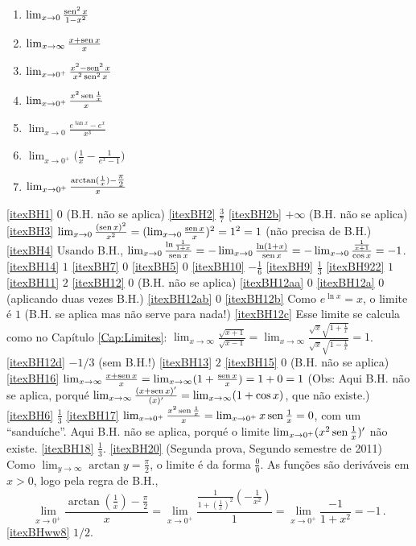 \begin{exo}
\begin{multicols}{3}
\begin{enumerate}
\item\label{itexBH15} $\lim_{x\to 0}\frac{\operatorname{sen}^2x}{1-x^2}$ 
\item\label{itexBH16} $\lim_{x\to \infty}\frac{x+\operatorname{sen} x}{x}$ 
\item\label{itexBH6} $\lim_{x\to 0^+}\frac{x^2-\operatorname{sen}^2 x}{x^2\operatorname{sen}^2 x}$
\item\label{itexBH17} $\lim_{x\to 0^+}\frac{x^2 \operatorname{sen} \frac{1}{x}}{x}$ 
\item\label{itexBH18} $\lim_{x\to 0}\frac{e^{\tan x}-e^x}{x^3}$ %
\item\label{itexBHww8} $\lim_{x\to
0^+}\bigl(\frac{1}{x}-\frac{1}{e^x-1}\bigr)$ %
\item\label{itexBH20} $\lim_{x\to 0^+}\frac{\arctan(\frac1x)-\tfrac{\pi}{2}}{x}$ 
\end{enumerate}
\end{multicols}
\vspace{0.01cm}
\begin{sol}
\eqref{itexBH1} $0$ (B.H. não se aplica)
\eqref{itexBH2} $\tfrac37$
\eqref{itexBH2b} $+\infty$ (B.H. não se aplica)
\eqref{itexBH3} $\lim_{x\to 0}\frac{(\operatorname{sen} x)^2}{x^2}=(\lim_{x\to 0}\frac{\operatorname{sen}
x}{x})^2=1^2=1$ (não precisa de B.H.)
\eqref{itexBH4} Usando B.H.,  $\lim_{x\to 0}\frac{\ln\frac{1}{1+x}}{\operatorname{sen} x}
=-\lim_{x\to 0}\frac{\ln(1+x)}{\operatorname{sen} x}=-\lim_{x\to 0}\frac{\frac{1}{x+1}}{\cos
x}=-1$.
\eqref{itexBH14} $1$
\eqref{itexBH7} $0$
\eqref{itexBH5} $0$
\eqref{itexBH10} $-\frac{1}{6}$
\eqref{itexBH9} $\tfrac13$ 
\eqref{itexBH922} $1$
\eqref{itexBH11} $2$
\eqref{itexBH12} $0$ (B.H. não se aplica)
\eqref{itexBH12aa} $0$ 
\eqref{itexBH12a} $0$ (aplicando duas vezes B.H.)
\eqref{itexBH12ab} $0$
\eqref{itexBH12b} Como $e^{\ln x}=x$, o limite é $1$ (B.H. se aplica mas não
serve para nada!)
\eqref{itexBH12c} Esse limite se calcula como no Capítulo \ref{Cap:Limites}:
$\lim_{x\to \infty}\frac{\sqrt{x+1}}{\sqrt{x-1}}=
\lim_{x\to \infty}\frac{\sqrt{x}\sqrt{1+\frac1x}}{\sqrt{x}\sqrt{1-\frac1x}}=
1$. 
\eqref{itexBH12d} $-1/3$ (sem B.H.!)
\eqref{itexBH13} $2$
\eqref{itexBH15} $0$ (B.H. não se aplica)
\eqref{itexBH16} $\lim_{x\to \infty}\frac{x+\operatorname{sen} x}{x}=\lim_{x\to
\infty}(1+\frac{\operatorname{sen} x}{x})=1+0=1$ (Obs: Aqui B.H. não se aplica, porqué
$\lim_{x\to \infty}\frac{(x+\operatorname{sen} x)'}{(x)'}=\lim_{x\to
\infty}(1+\cos x)$, que  não existe.)
\eqref{itexBH6} $\tfrac13$
\eqref{itexBH17} $\lim_{x\to 0^+}\frac{x^2 \operatorname{sen} \frac{1}{x}}{x}=
\lim_{x\to 0^+} x\operatorname{sen} \frac{1}{x}=0$, com um ``sanduíche''. Aqui B.H. não se
aplica, porqué o limite $\lim_{x\to 0^+}(x^2 \operatorname{sen} \frac{1}{x})'$ não existe.
\eqref{itexBH18} $\frac13$. \eqref{itexBH20} (Segunda prova, Segundo semestre de
2011) Como $\lim_{y \to
\infty}\arctan y=\frac{\pi}{2}$, o limite 
é da forma $\frac00$. As funções são deriváveis em $x>0$, logo pela
regra de B.H.,
$$
\lim_{x\to 0^+}\frac{\arctan(\frac1x)-\tfrac{\pi}{2}}{x}=
\lim_{x\to 0^+}\frac{\frac{1}{1+(\frac{1}{x})^2}(-\frac{1}{x^2})}{1}=
\lim_{x\to 0^+}\frac{-1}{1+x^2}=-1\,.
$$
\eqref{itexBHww8} $1/2$.
\end{sol}
\end{exo}



